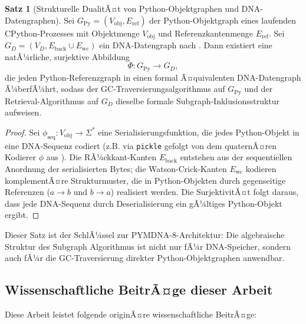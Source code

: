 ﻿\documentclass[a4paper,12pt]{article}
\theoremstyle{definition}
\newtheorem{satz}{Satz}[section]
\begin{document}
\begin{satz}[Strukturelle DualitÃ¤t von Python-Objektgraphen und DNA-Datengraphen]
  \label{satz:dualitaet}
  Sei $G_{\mathrm{Py}} = (V_{\mathrm{obj}}, E_{\mathrm{ref}})$ der
  Python-Objektgraph eines laufenden CPython-Prozesses mit Objektmenge
  $V_{\mathrm{obj}}$ und Referenzkantenmenge $E_{\mathrm{ref}}$.
  Sei $G_D = (V_D, E_{\mathrm{back}} \cup E_{\mathrm{wc}})$ ein DNA-Datengraph
  nach \cite{epp2026dnastor}.
  Dann existiert eine natÃ¼rliche, surjektive Abbildung
  \[
    \Phi: G_{\mathrm{Py}} \to G_D,
  \]
  die jeden Python-Referenzgraph in einen formal Ã¤quivalenten DNA-Datengraph
  Ã¼berfÃ¼hrt, sodass der GC-Traversierungsalgorithmus auf $G_{\mathrm{Py}}$
  und der Retrieval-Algorithmus auf $G_D$ dieselbe formale Subgraph-Inklusionsstruktur
  aufweisen.
\end{satz}

\begin{proof}
  Sei $\phi_{\mathrm{seq}}: V_{\mathrm{obj}} \to \Sigma^*$ eine Serialisierungsfunktion,
  die jedes Python-Objekt in eine DNA-Sequenz codiert (z.B. via \texttt{pickle}
  gefolgt von dem quaternÃ¤ren Kodierer $\phi$ aus \cite{epp2026dnastor}).
  Die RÃ¼ckkant-Kanten $E_{\mathrm{back}}$ entstehen aus der sequentiellen
  Anordnung der serialisierten Bytes; die Watson-Crick-Kanten $E_{\mathrm{wc}}$
  kodieren komplementÃ¤re Strukturmuster, die in Python-Objekten durch
  gegenseitige Referenzen ($a \to b$ und $b \to a$) realisiert werden.
  Die SurjektivitÃ¤t folgt daraus, dass jede DNA-Sequenz durch Deserialisierung
  ein gÃ¼ltiges Python-Objekt ergibt.
\end{proof}

Dieser Satz ist der SchlÃ¼ssel zur PYMDNA-8-Architektur: Die algebraische
Struktur des Subgraph Algorithmus ist nicht nur fÃ¼r DNA-Speicher, sondern
auch fÃ¼r die GC-Traversierung direkter Python-Objektgraphen anwendbar.

\subsection{Wissenschaftliche BeitrÃ¤ge dieser Arbeit}

Diese Arbeit leistet folgende originÃ¤re wissenschaftliche BeitrÃ¤ge:
\end{document}
